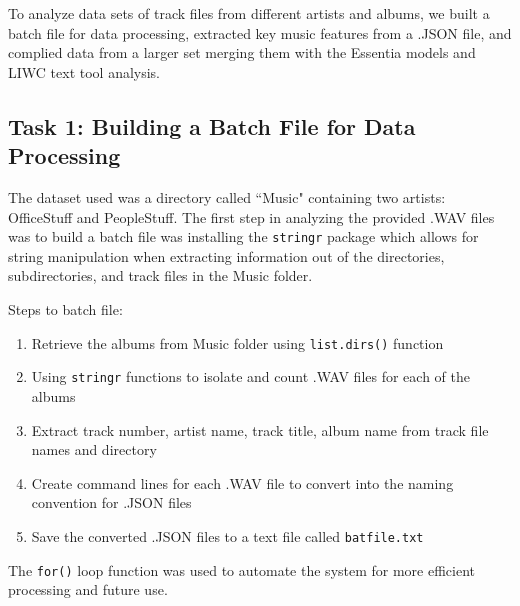 \documentclass{article}\usepackage[]{graphicx}\usepackage[]{xcolor}
\begin{document}
\begin{multicols}{2}
To analyze data sets of track files from different artists and albums, we built a batch file for data processing, extracted key music features from a .JSON file, and complied data from a larger set merging them with the Essentia models and LIWC text tool analysis.


\subsection{Task 1: Building a Batch File for Data Processing}

The dataset used was a directory called ``Music" containing two artists: OfficeStuff and PeopleStuff. The first step in analyzing the provided .WAV files was to build a batch file was installing the \texttt{stringr} package which allows for string manipulation when extracting information out of the directories, subdirectories, and track files in the Music folder. 

Steps to batch file:
\begin{enumerate}
  \item Retrieve the albums from Music folder using \texttt{list.dirs()} function
  \item Using \texttt{stringr} functions to isolate and count .WAV files for each of the albums
  \item Extract track number, artist name, track title, album name from track file names and directory
  \item Create command lines for each .WAV file to convert into the naming convention for .JSON files
  \item Save the converted .JSON files to a text file called \texttt{batfile.txt}
\end{enumerate}
The \texttt{for()} loop function was used to automate the system for more efficient processing and future use.


\end{multicols}
\end{document}
